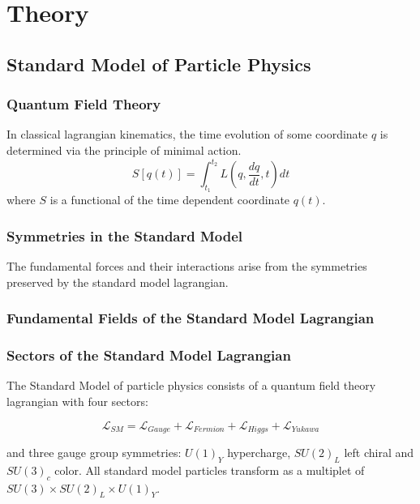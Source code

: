 \chapter{Theory}

\section{Standard Model of Particle Physics}

\subsection{Quantum Field Theory}

In classical lagrangian kinematics, the time evolution of some coordinate $q$ is determined via the principle of minimal action. 
\begin{equation}
S[q(t)] = \int_{t_1}^{t_2} L(q,\frac{dq}{dt},t) dt
\end{equation}
where $S$ is a functional of the time dependent coordinate $q(t)$. 

\subsection{Symmetries in the Standard Model}

The fundamental forces and their interactions arise from the symmetries preserved by the standard model lagrangian. 

\subsection{Fundamental Fields of the Standard Model Lagrangian}



\subsection{Sectors of the Standard Model Lagrangian}

The Standard Model of particle physics consists of a quantum field theory lagrangian with four sectors:

\begin{equation}
\mathcal{L}_{SM} = \mathcal{L}_{Gauge} + \mathcal{L}_{Fermion} + \mathcal{L}_{Higgs} + \mathcal{L}_{Yukawa}
\end{equation}

and three gauge group symmetries: $U(1)_Y$ hypercharge, 
$SU(2)_L$ left chiral and $SU(3)_c$ color. All standard model particles transform as a multiplet of
 $SU(3) \times SU(2)_L \times U(1)_Y$.

